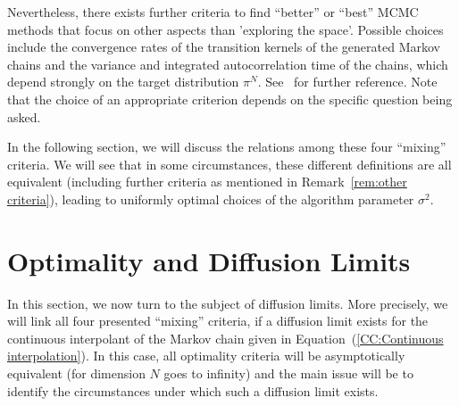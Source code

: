 \begin{rem}\label{rem:other criteria}
Nevertheless, there exists further criteria to find ``better'' or ``best'' MCMC methods that focus on other aspects than 'exploring the space'. Possible choices include the convergence rates of the transition kernels of the generated Markov chains and the variance and integrated autocorrelation time of the chains, which depend strongly on the target distribution $ \pi^{N} $. See~\autocite{Rosenthal2008} for further reference. Note that the choice of an appropriate criterion depends on the specific question being asked. 
\end{rem}

In the following section, we will discuss the relations among these four ``mixing'' criteria. We will see that in some circumstances, these different definitions are all equivalent (including further criteria as mentioned in Remark~\ref{rem:other criteria}), leading to uniformly optimal choices of the algorithm parameter $\sigma^2$.


\section{Optimality and Diffusion Limits}
\label{CC:Optimality and Diffusion Limits}

In this section, we now turn to the subject of diffusion limits. More precisely, we will link all four presented ``mixing'' criteria, if a diffusion limit exists for the continuous interpolant of the Markov chain given in Equation~(\ref{CC:Continuous interpolation}). In this case, all optimality criteria will be asymptotically equivalent (for dimension $N$ goes to infinity) and the main issue will be to identify the circumstances under which such a diffusion limit exists.

